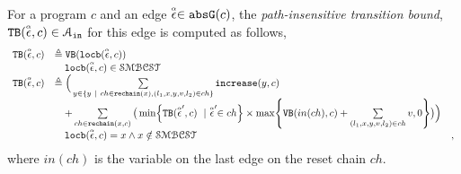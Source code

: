 %
%
\begin{defn}
  \label{def:edge_pathinsensitivebound}
  For a program $c$ and an edge $\stackrel{\scriptscriptstyle{\alpha}}{\mathtt{\epsilon}{}} \in \mathtt{abs}{\mathtt{G}}(c)$, the \emph{path-insensitive transition bound},
  ${\mathtt{TB}}(\stackrel{\scriptscriptstyle{\alpha}}{\mathtt{\epsilon}{}}, c) \in \mathcal{A}_{\mathtt{in}}$ 
for this edge is
computed as follows,
\[ 
\begin{array}{lll}
  \absclr(\absevent, c) 
  & \triangleq \varinvar(\locbound(\absevent, c))  & \\
  & \quad \locbound(\absevent, c) \in \constdom & \\
  \absclr(\absevent, c) 
  & \triangleq \Big(
    \sum\limits_{y \in \{ y ~|~ 
    ch \in \resetchain(x), (l_1, x, y, v, l_2) \in ch \} } \incrs(y, c) & \\
    & \quad + 
  \sum\limits_{ch \in \resetchain(x, c)}
  \big( \min\left\{\absclr(\absevent', c) ~\mid~ \absevent' \in ch\right\} \times 
  \max\left\{\varinvar(in(ch), c) + \sum\limits_{(l_1, x, y, v, l_2) \in ch } v, 0 \right\}\big) \Big)  & \\
  &  \quad \locbound(\absevent, c) = x \land x \notin \constdom & ,
\end{array}
  \]
 where $in(ch)$ is the variable on the last edge on the reset chain $ch$.
\end{defn}
